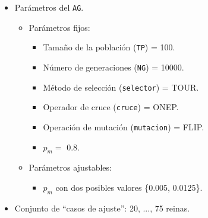 \begin{itemize}
	\item Parámetros del \texttt{AG}.
	\begin{itemize}
		\item Parámetros fijos:
		\begin{itemize}
			\item Tamaño de la población (\texttt{TP}) = 100.
			\item Número de generaciones (\texttt{NG}) = 10000.
			\item Método de selección (\texttt{selector}) = TOUR.
			\item Operador de cruce (\texttt{cruce}) = ONEP.
			\item Operación de mutación (\texttt{mutacion}) = FLIP.
			\item $p_m =$ 0.8.
		\end{itemize}
		\item Parámetros ajustables:
		\begin{itemize}
			\item $p_m$ con dos posibles valores \{0.005, 0.0125\}.
		\end{itemize}
	\end{itemize}
	\item Conjunto de ``casos de ajuste'': 20, ..., 75 reinas.
\end{itemize}




